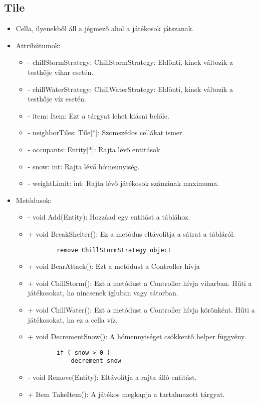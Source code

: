 \subsection{Tile}
\begin{itemize}
	\item Cella, ilyenekből áll a jégmező ahol a játékosok játszanak.
	\item Attribútumok:
	\begin{itemize}
		\item - chillStormStrategy: ChillStormStrategy: Eldönti, kinek változik a testhője vihar esetén.
		\item - chillWaterStrategy: ChillWaterStrategy: Eldönti, kinek változik a testhője víz esetén.
		\item - item: Item: Ezt a tárgyat lehet kiásni belőle.
		\item - neighborTiles: Tile[*]: Szomszédos cellákat ismer.
		\item - occupants: Entity[*]: Rajta lévő entitások.
		\item - snow: int: Rajta lévő hómennyiség.
		\item - weightLimit: int: Rajta lévő játékosok számának maximuma.		
	\end{itemize}
	\item Metódusok:
	\begin{itemize}
		\item - void Add(Entity): Hozzáad egy entitást a táblához.
		\item + void BreakShelter(): Ez a metódus eltávolítja a sátrat a tábláról.
		\begin{lstlisting}
		remove ChillStormStrategy object
		\end{lstlisting}
		\item + void BearAttack(): Ezt a metódust a Controller hívja 
		\item + void ChillStorm(): Ezt a metódust a Controller hívja viharban. Hűti a játékosokat, ha nincsenek igluban vagy sátorban.
		\item + void ChillWater(): Ezt a metódust a Controller hívja körönként. Hűti a játékosokat, ha ez a cella víz.
		\item + void DecrementSnow(): A hómennyiséget csökkentő helper függvény.
		\begin{lstlisting}
		if ( snow > 0 )
			decrement snow
		\end{lstlisting}
		\item - void Remove(Entity): Eltávolítja a rajta álló entitást.
		\item + Item TakeItem(): A játékos megkapja a tartalmazott tárgyat.

\end{itemize}
\end{itemize}

